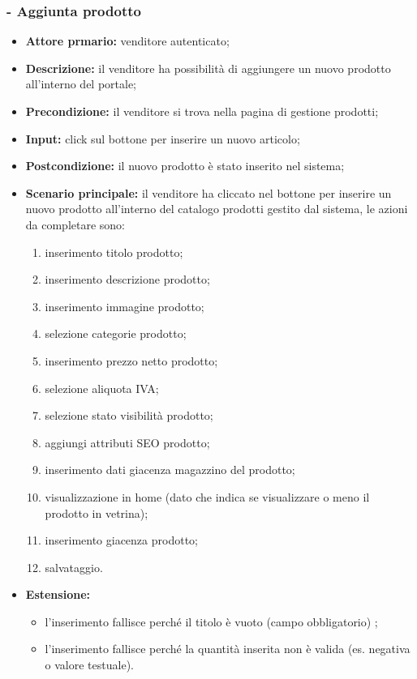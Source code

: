 \subsubsection{- Aggiunta prodotto}
\begin{itemize}
    \item \textbf{Attore prmario:} venditore autenticato;
    \item \textbf{Descrizione:} il venditore ha possibilità di aggiungere un nuovo prodotto all’interno del portale;
    \item \textbf{Precondizione:} il venditore si trova nella pagina di gestione prodotti;
    \item \textbf{Input:} click sul bottone per inserire un nuovo articolo;
    \item \textbf{Postcondizione:} il nuovo prodotto è stato inserito nel sistema;
    \item \textbf{Scenario principale:} il venditore ha cliccato nel bottone per inserire un nuovo prodotto all’interno del catalogo prodotti gestito dal sistema, le azioni da completare sono:
          \begin{enumerate}
              \item inserimento titolo prodotto;
              \item inserimento descrizione prodotto;
              \item inserimento immagine prodotto;
              \item selezione categorie prodotto;
              \item inserimento prezzo netto prodotto;
              \item selezione aliquota IVA;
              \item selezione stato visibilità prodotto;
              \item aggiungi attributi SEO prodotto;
              \item inserimento dati giacenza magazzino del prodotto;
              \item visualizzazione in home (dato che indica se visualizzare o meno il prodotto in vetrina);
              \item inserimento giacenza prodotto;
              \item salvataggio.
          \end{enumerate}
    \item \textbf{Estensione:}
          \begin{itemize}
              \item l'inserimento fallisce perché il titolo è vuoto (campo obbligatorio) ;
              \item l'inserimento fallisce perché la quantità inserita non è valida (es. negativa o valore testuale).
          \end{itemize}
\end{itemize}

